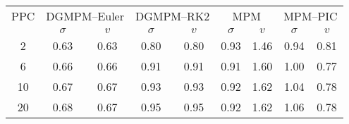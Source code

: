   \begin{tabular}{c|cc|cc|cc|cc}
    \hline
    PPC & \multicolumn{2}{c}{DGMPM--Euler}  \vline & \multicolumn{2}{c}{DGMPM--RK2}\vline  & \multicolumn{2}{c}{MPM} \vline & \multicolumn{2}{c}{MPM--PIC}  \\ [6pt]
    & $\sigma$ & $v$  & $\sigma$ & $v$  & $\sigma$ & $v$ & $\sigma$ & $v$\\ 
    \hline
    \hline
    2 & 0.63 & 0.63 & 0.80 &0.80 & 0.93 & 1.46 & 0.94&0.81 \\
    6 & 0.66 & 0.66 & 0.91 &0.91 & 0.91 & 1.60 & 1.00&0.77\\
    10 & 0.67 & 0.67 & 0.93 &0.93 & 0.92 & 1.62 & 1.04&0.78\\
    20 & 0.68 & 0.67 & 0.95 &0.95 & 0.92 & 1.62 & 1.06&0.78\\
  \end{tabular}

